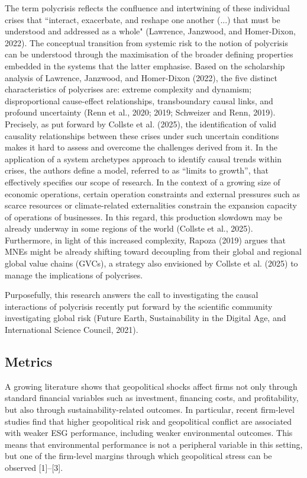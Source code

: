\documentclass[12pt,a4paper]{article}
\begin{document}
The term polycrisis reflects the confluence and intertwining of these individual crises that “interact, exacerbate, and reshape one another (...) that must be understood and addressed as a whole" (Lawrence, Janzwood, and Homer-Dixon, 2022). The conceptual transition from systemic risk to the notion of polycrisis can be understood through the maximisation of the broader defining properties embedded in the systems that the latter emphasise. Based on the scholarship analysis of Lawrence, Janzwood, and Homer-Dixon (2022), the five distinct characteristics of polycrises are: extreme complexity and dynamism; disproportional cause-effect relationships, transboundary causal links, and profound uncertainty (Renn et al., 2020; 2019; Schweizer and Renn, 2019). Precisely, as put forward by Collste et al. (2025), the identification of valid causality relationships between these crises under such uncertain conditions makes it hard to assess and overcome the challenges derived from it. In the application of a system archetypes approach to identify causal trends within crises, the authors define a model, referred to as “limits to growth”, that effectively specifies our scope of research. In the context of a growing size of economic operations, certain operation constraints and external pressures such as scarce resources or climate-related externalities constrain the expansion capacity of operations of businesses. In this regard, this production slowdown may be already underway in some regions of the world (Collste et al., 2025). Furthermore, in light of this increased complexity, Rapoza (2019) argues that MNEs might be already shifting toward decoupling from their global and regional global value chains (GVCs), a strategy also envisioned by Collste et al. (2025) to manage the implications of polycrises. 

Purposefully, this research answers the call to investigating the causal interactions of polycrisis recently put forward by the scientific community investigating global risk (Future Earth, Sustainability in the Digital Age, and International Science Council, 2021). 
\newpage

\subsection{Metrics}

A growing literature shows that geopolitical shocks affect firms not only through standard financial variables such as investment, financing costs, and profitability, but also through sustainability-related outcomes. In particular, recent firm-level studies find that higher geopolitical risk and geopolitical conflict are associated with weaker ESG performance, including weaker environmental outcomes. This means that environmental performance is not a peripheral variable in this setting, but one of the firm-level margins through which geopolitical stress can be observed [1]–[3].
\end{document}
